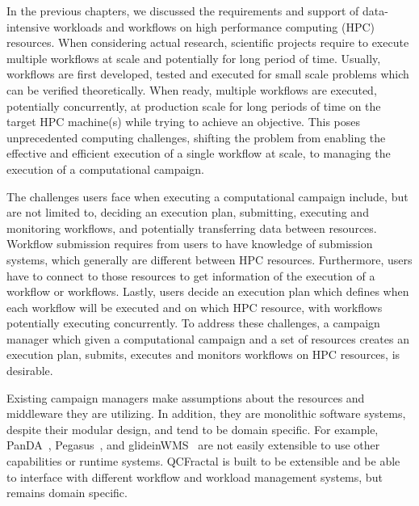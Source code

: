\label{ch:cmanager}

In the previous chapters, we discussed the requirements and support of 
data-intensive workloads and workflows on high performance computing (HPC) 
resources. When considering actual research, scientific projects require to 
execute multiple workflows at scale and potentially for long period of time.
Usually, workflows are first developed, tested and executed for small scale 
problems which can be verified theoretically. When ready, multiple workflows 
are executed, potentially concurrently, at production scale for long periods 
of time on the target HPC machine(s) while trying to achieve an objective. 
This poses unprecedented computing challenges, shifting the problem from 
enabling the effective and efficient execution of a single workflow at scale, 
to managing the execution of a computational campaign.

The challenges users face when executing a computational campaign include, but 
are not limited to, deciding an execution plan, submitting, executing and 
monitoring workflows, and potentially transferring data between resources.
Workflow submission requires from users to have knowledge of submission 
systems, which generally are different between HPC resources. Furthermore, 
users have to connect to those resources to get information of the execution 
of a workflow or workflows. Lastly, users decide an execution plan which 
defines when each workflow will be executed and on which HPC resource, with 
workflows potentially executing concurrently. To address these challenges, a 
campaign manager which given a computational campaign and a set of resources 
creates an execution plan, submits, executes and monitors workflows on HPC 
resources, is desirable.

Existing campaign managers make assumptions about the resources and middleware 
they are utilizing. In addition, they are monolithic software systems, despite 
their modular design, and tend to be domain specific. For example, 
PanDA~\cite{maeno2008panda}, Pegasus~\cite{deelman2015pegasus}, and 
glideinWMS~\cite{sfiligoi2008glidein} are not easily extensible to use other 
capabilities or runtime systems. QCFractal is built to be extensible and be 
able to interface with different workflow and workload management systems, but 
remains domain specific.

